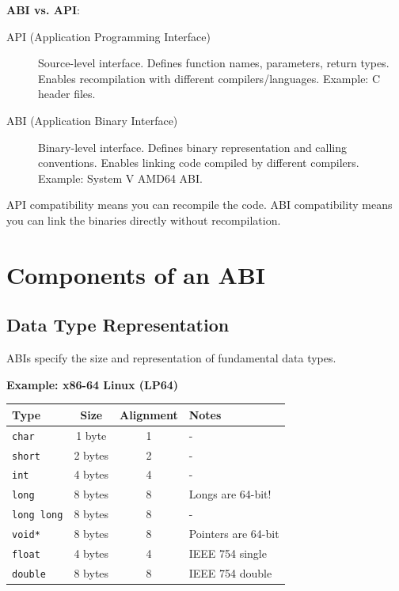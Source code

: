 \textbf{ABI vs. API}:

\begin{description}
    \item[API (Application Programming Interface)] Source-level interface. Defines function names, parameters, return types. Enables recompilation with different compilers/languages. Example: C header files.
    \item[ABI (Application Binary Interface)] Binary-level interface. Defines binary representation and calling conventions. Enables linking code compiled by different compilers. Example: System V AMD64 ABI.
\end{description}

\begin{tip}
API compatibility means you can recompile the code. ABI compatibility means you can link the binaries directly without recompilation.
\end{tip}

\section{Components of an ABI}

\subsection{Data Type Representation}

ABIs specify the size and representation of fundamental data types.

\textbf{Example: x86-64 Linux (LP64)}

\begin{tabular}{|l|c|c|l|}
\hline
\textbf{Type} & \textbf{Size} & \textbf{Alignment} & \textbf{Notes} \\
\hline
\texttt{char} & 1 byte & 1 & - \\
\hline
\texttt{short} & 2 bytes & 2 & - \\
\hline
\texttt{int} & 4 bytes & 4 & - \\
\hline
\texttt{long} & 8 bytes & 8 & Longs are 64-bit! \\
\hline
\texttt{long long} & 8 bytes & 8 & - \\
\hline
\texttt{void*} & 8 bytes & 8 & Pointers are 64-bit \\
\hline
\texttt{float} & 4 bytes & 4 & IEEE 754 single \\
\hline
\texttt{double} & 8 bytes & 8 & IEEE 754 double \\
\hline
\end{tabular}

